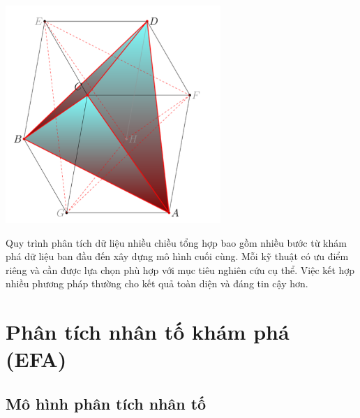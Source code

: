 \noindent %
\begin{minipage}{0.4\textwidth} %
    \centering
    \includegraphics[width=\textwidth]{../../assets/images/figure-1.png} %
    \label{fig:multivariate_workflow}
\end{minipage}%
\hfill %
\begin{minipage}{0.55\textwidth} %
    Quy trình phân tích dữ liệu nhiều chiều tổng hợp bao gồm nhiều bước từ khám phá dữ liệu ban đầu đến xây dựng mô hình cuối cùng. Mỗi kỹ thuật có ưu điểm riêng và cần được lựa chọn phù hợp với mục tiêu nghiên cứu cụ thể. Việc kết hợp nhiều phương pháp thường cho kết quả toàn diện và đáng tin cậy hơn.
\end{minipage}

\section{Phân tích nhân tố khám phá (EFA)}

\subsection{Mô hình phân tích nhân tố}

